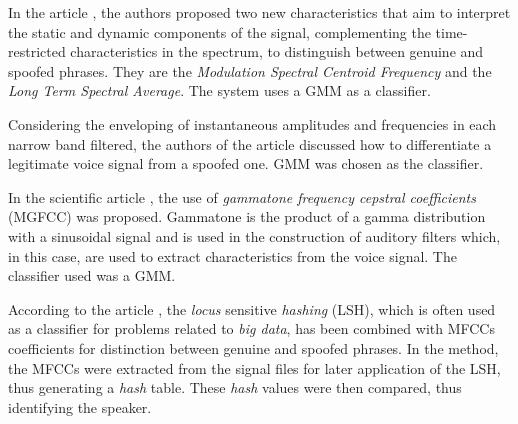 	\par In the article \cite{Suthokumar2018}, the authors proposed two new characteristics that aim to interpret the static and dynamic components of the signal, complementing the time-restricted characteristics in the spectrum, to distinguish between genuine and spoofed phrases. They are the \textit{Modulation Spectral Centroid Frequency} and the \textit{Long Term Spectral Average}. The system uses a GMM as a classifier.
	
	\par Considering the enveloping of instantaneous amplitudes and frequencies in each narrow band filtered, the authors of the article \cite{ISI:000458728700054} discussed how to differentiate a legitimate voice signal from a spoofed one. GMM was chosen as the classifier.

	\par In the scientific article \cite{ISI:000392503100008}, the use of \textit{gammatone frequency cepstral coefficients} (MGFCC) was proposed. Gammatone is the product of a gamma distribution with a sinusoidal signal and is used in the construction of auditory filters which, in this case, are used to extract characteristics from the voice signal. The classifier used was a GMM.
	
	\par According to the article \cite{8396208}, the \textit{locus} sensitive \textit{hashing} (LSH), which is often used as a classifier for problems related to \textit{big data}, has been combined with MFCCs coefficients for distinction between genuine and spoofed phrases. In the method, the MFCCs were extracted from the signal files for later application of the LSH, thus generating a \textit{hash} table. These \textit{hash} values were then compared, thus identifying the speaker.	
	
